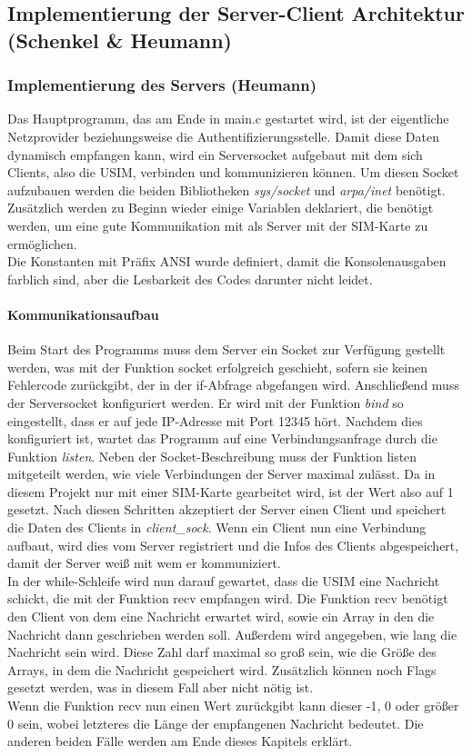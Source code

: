 \subsection{Implementierung der Server-Client Architektur (Schenkel \& Heumann)}
\label{server-client-architektur}
	\subsubsection{Implementierung des Servers (Heumann)}
    	\label{subsec:impl_server}
	Das Hauptprogramm, das am Ende in main.c gestartet wird, ist der eigentliche Netzprovider beziehungsweise
	die Authentifizierungsstelle. Damit diese Daten dynamisch empfangen kann, wird ein Serversocket aufgebaut
	mit dem sich Clients, also die USIM, verbinden und kommunizieren können. Um diesen Socket aufzubauen werden
	die beiden Bibliotheken \emph{sys/socket} und \emph{arpa/inet} benötigt. Zusätzlich werden zu Beginn wieder
	einige Variablen deklariert, die benötigt werden, um eine gute Kommunikation mit als Server mit der SIM-Karte
	zu ermöglichen. \\
	Die Konstanten mit Präfix ANSI wurde definiert, damit die Konsolenausgaben farblich sind, aber die Lesbarkeit des
	Codes darunter nicht leidet.
	
		\paragraph{Kommunikationsaufbau}
		Beim Start des Programms muss dem Server ein Socket zur Verfügung gestellt werden, was mit der Funktion
		socket erfolgreich geschieht, sofern sie keinen Fehlercode zurückgibt, der in der if-Abfrage abgefangen wird.
		Anschließend muss	der Serversocket konfiguriert werden. Er wird mit der Funktion \emph{bind} so eingestellt, dass er
		auf jede IP-Adresse mit Port 12345 hört. Nachdem dies konfiguriert ist, wartet das Programm auf eine Verbindungsanfrage
		durch die Funktion \emph{listen}. Neben der Socket-Beschreibung muss der Funktion listen mitgeteilt werden, wie viele Verbindungen
		der Server maximal zulässt. Da in diesem Projekt nur mit einer SIM-Karte gearbeitet wird, ist der Wert also auf 1 gesetzt.
		Nach diesen Schritten akzeptiert der Server einen Client und speichert die Daten des Clients in \emph{client\_sock}.
		Wenn ein Client nun eine Verbindung aufbaut, wird dies vom Server registriert und die Infos des Clients abgespeichert,
		damit der Server weiß mit wem er kommuniziert. \\
		In der while-Schleife wird nun darauf gewartet, dass die USIM eine Nachricht schickt, die mit der Funktion recv empfangen
		wird. Die Funktion recv benötigt den Client von dem eine Nachricht erwartet wird, sowie ein Array in den die Nachricht dann
		geschrieben werden soll. Außerdem wird angegeben, wie lang die Nachricht sein wird. Diese Zahl darf maximal
		so groß sein, wie die Größe des Arrays, in dem die Nachricht gespeichert wird. Zusätzlich können noch Flags
		gesetzt werden, was in diesem Fall aber nicht nötig ist. \\
		Wenn die Funktion recv nun einen Wert zurückgibt kann dieser -1, 0 oder größer 0 sein, wobei letzteres die
		Länge der empfangenen Nachricht bedeutet. Die anderen beiden Fälle werden am Ende dieses Kapitels erklärt.
		
